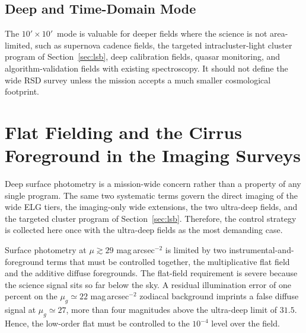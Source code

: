 \documentclass[10pt,onecolumn]{article}
\newcommand{\fovsmall}{$10'\!\times10'$}
\begin{document}
\subsection{Deep and Time-Domain Mode}

The \fovsmall\ mode is valuable for deeper fields where the science is not area-limited, such as supernova cadence fields, the targeted intracluster-light cluster program of Section~\ref{sec:lsb}, deep calibration fields, quasar monitoring, and algorithm-validation fields with existing spectroscopy. It should not define the wide RSD survey unless the mission accepts a much smaller cosmological footprint.

\clearpage
\section{Flat Fielding and the Cirrus Foreground in the Imaging Surveys}\label{sec:flatcirrus}

Deep surface photometry is a mission-wide concern rather than a property of any single program. The same two systematic terms govern the direct imaging of the wide ELG tiers, the imaging-only wide extensions, the two ultra-deep fields, and the targeted cluster program of Section~\ref{sec:lsb}. Therefore, the control strategy is collected here once with the ultra-deep fields as the most demanding case.

Surface photometry at $\mu\gtrsim29$ mag\,arcsec$^{-2}$ is limited by two instrumental-and-foreground terms that must be controlled together, the multiplicative flat field and the additive diffuse foregrounds. The flat-field requirement is severe because the science signal sits so far below the sky. A residual illumination error of one percent on the $\mu_g\simeq22$ mag\,arcsec$^{-2}$ zodiacal background imprints a false diffuse signal at $\mu_g\simeq27$, more than four magnitudes above the ultra-deep limit of $31.5$. Hence, the low-order flat must be controlled to the $10^{-4}$ level over the field.
\end{document}
